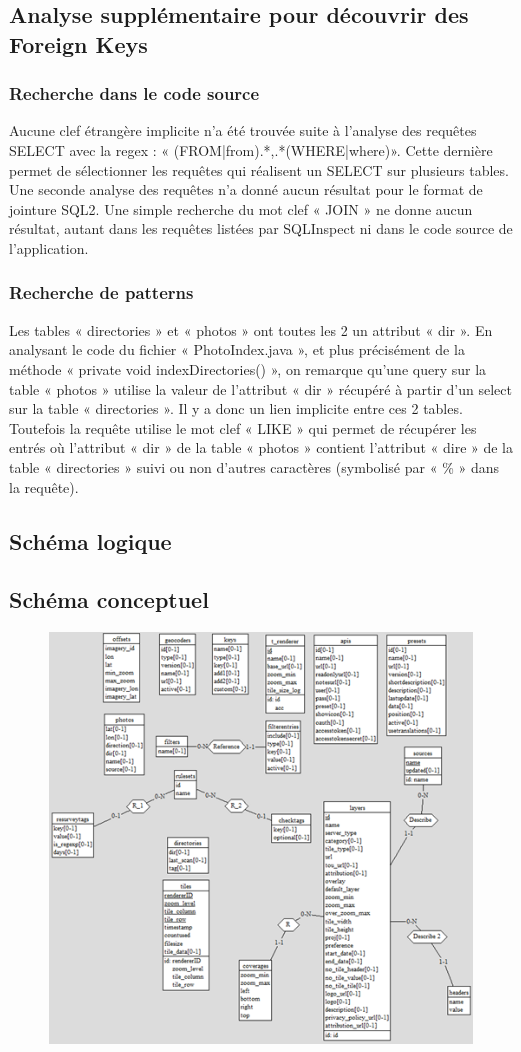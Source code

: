 \subsection{Analyse supplémentaire pour découvrir des Foreign Keys}
\subsubsection{Recherche dans le code source}
Aucune clef étrangère implicite n'a été trouvée suite à l'analyse des requêtes SELECT avec la regex : « (FROM|from).*,.*(WHERE|where)». Cette dernière permet de sélectionner les requêtes qui réalisent un SELECT sur plusieurs tables.
Une seconde analyse des requêtes n'a donné aucun résultat pour le format de jointure SQL2. Une simple recherche du mot clef « JOIN » ne donne aucun résultat, autant dans les requêtes listées par SQLInspect ni dans le code source de l'application.

\subsubsection{Recherche de patterns}
Les tables « directories » et « photos » ont toutes les 2 un attribut « dir ». En analysant le code du fichier « PhotoIndex.java », et plus précisément de la méthode « private void indexDirectories() », on remarque qu'une query sur la table « photos » utilise la valeur de l'attribut « dir » récupéré à partir d'un select sur la table « directories ». Il y a donc un lien implicite entre ces 2 tables. Toutefois la requête utilise le mot clef « LIKE » qui permet de récupérer les entrés où l'attribut « dir » de la table « photos » contient l'attribut « dire » de la table « directories » suivi ou non d'autres caractères (symbolisé par « \% » dans la requête).

\subsection{Schéma logique}

\subsection{Schéma conceptuel}

\begin{figure}[h!]
    \centering
    \includegraphics[scale=1]{schema_conceptuel.png}
    \label{fig:schéma conceptuel}
\end{figure}